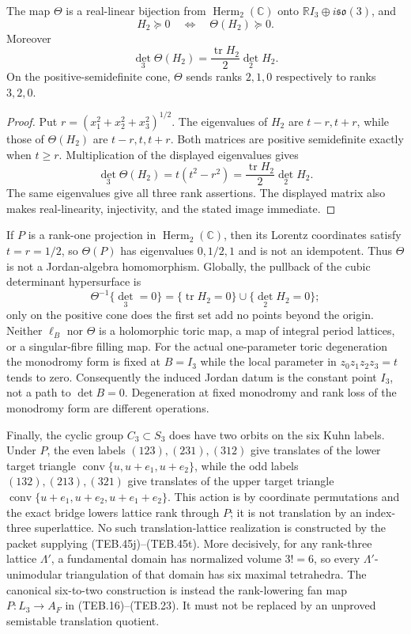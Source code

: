 \begin{proposition}
\label{prop:teb-theta-order-lift}
The map \(\Theta\) is a real-linear bijection from
\(\operatorname{Herm}_2(\mathbb C)\) onto
\(\mathbb RI_3\oplus i\mathfrak{so}(3)\), and
\[
 H_2\succeq0\quad\Longleftrightarrow\quad
 \Theta(H_2)\succeq0.                                  \tag{TEB.45s}
\]
Moreover
\[
 \boxed{\det_3\Theta(H_2)
 =\frac{\operatorname{tr}H_2}{2}\det_2H_2.}             \tag{TEB.45t}
\]
On the positive-semidefinite cone, \(\Theta\) sends ranks
\(2,1,0\) respectively to ranks \(3,2,0\).
\end{proposition}

\begin{proof}
Put \(r=(x_1^2+x_2^2+x_3^2)^{1/2}\).  The eigenvalues of \(H_2\) are
\(t-r,t+r\), while those of \(\Theta(H_2)\) are
\(t-r,t,t+r\).  Both matrices are positive semidefinite exactly when
\(t\geq r\).  Multiplication of the displayed eigenvalues gives
\[
 \det_3\Theta(H_2)=t(t^2-r^2)
 =\frac{\operatorname{tr}H_2}{2}\det_2H_2.
\]
The same eigenvalues give all three rank assertions.  The displayed matrix
also makes real-linearity, injectivity, and the stated image immediate.
\end{proof}

If \(P\) is a rank-one projection in
\(\operatorname{Herm}_2(\mathbb C)\), then its Lorentz coordinates satisfy
\(t=r=1/2\), so \(\Theta(P)\) has eigenvalues \(0,1/2,1\) and is not an
idempotent.  Thus \(\Theta\) is not a Jordan-algebra homomorphism.  Globally,
the pullback of the cubic determinant hypersurface is
\[
 \Theta^{-1}\{\det_3=0\}
 =\{\operatorname{tr}H_2=0\}\cup\{\det_2H_2=0\};         \tag{TEB.45u}
\]
only on the positive cone does the first set add no points beyond the origin.
Neither \(\ell_B\) nor \(\Theta\) is a holomorphic toric map, a map of
integral period lattices, or a singular-fibre filling map.  For the actual
one-parameter toric degeneration the monodromy form is fixed at \(B=I_3\)
while the local parameter in \(z_0z_1z_2z_3=t\) tends to zero.  Consequently
the induced Jordan datum is the constant point \(I_3\), not a path to
\(\det B=0\).  Degeneration at fixed monodromy and rank loss of the monodromy
form are different operations.

Finally, the cyclic group \(C_3\subset S_3\) does have two orbits on the six
Kuhn labels.  Under \(P\), the even labels
\((123),(231),(312)\) give translates of the lower target triangle
\(\operatorname{conv}\{u,u+e_1,u+e_2\}\), while the odd labels
\((132),(213),(321)\) give translates of the upper target triangle
\(\operatorname{conv}\{u+e_1,u+e_2,u+e_1+e_2\}\).  This action is by
coordinate permutations and the exact bridge lowers lattice rank through
\(P\); it is not translation by an index-three superlattice.  No such
translation-lattice realization is constructed by the packet supplying
(TEB.45j)--(TEB.45t).  More decisively,
for any rank-three lattice \(\Lambda'\), a fundamental domain has normalized
volume \(3!=6\), so every \(\Lambda'\)-unimodular triangulation of that domain
has six maximal tetrahedra.  The canonical six-to-two construction is instead
the rank-lowering fan map \(P:L_3\to A_F\) in (TEB.16)--(TEB.23).  It must not
be replaced by an unproved semistable translation quotient.

